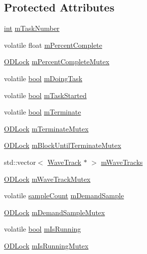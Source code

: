 \subsection*{Protected Attributes}
\begin{DoxyCompactItemize}
\item 
\hyperlink{xmltok_8h_a5a0d4a5641ce434f1d23533f2b2e6653}{int} \hyperlink{class_o_d_task_aac8bea3092cb5afa53b6f529b54afb26}{m\+Task\+Number}
\item 
volatile float \hyperlink{class_o_d_task_a81842f8c6d99d72ce3cd215c113a261d}{m\+Percent\+Complete}
\item 
\hyperlink{class_o_d_lock}{O\+D\+Lock} \hyperlink{class_o_d_task_add5ff78b44107292569dfdeeb90c8118}{m\+Percent\+Complete\+Mutex}
\item 
volatile \hyperlink{mac_2config_2i386_2lib-src_2libsoxr_2soxr-config_8h_abb452686968e48b67397da5f97445f5b}{bool} \hyperlink{class_o_d_task_ad90a5f35f8ec6c50357c9328781ee542}{m\+Doing\+Task}
\item 
volatile \hyperlink{mac_2config_2i386_2lib-src_2libsoxr_2soxr-config_8h_abb452686968e48b67397da5f97445f5b}{bool} \hyperlink{class_o_d_task_a0f4099666c884667eebb9433bcc3d6c7}{m\+Task\+Started}
\item 
volatile \hyperlink{mac_2config_2i386_2lib-src_2libsoxr_2soxr-config_8h_abb452686968e48b67397da5f97445f5b}{bool} \hyperlink{class_o_d_task_a38dd3cdea39254e59c505f5bfc9127e5}{m\+Terminate}
\item 
\hyperlink{class_o_d_lock}{O\+D\+Lock} \hyperlink{class_o_d_task_aa534f7033d7c3fc06a55f24aac50482a}{m\+Terminate\+Mutex}
\item 
\hyperlink{class_o_d_lock}{O\+D\+Lock} \hyperlink{class_o_d_task_a645d01cc507dfa49c3f7032753812bb2}{m\+Block\+Until\+Terminate\+Mutex}
\item 
std\+::vector$<$ \hyperlink{class_wave_track}{Wave\+Track} $\ast$ $>$ \hyperlink{class_o_d_task_aba0bd65cc43443f5eb27bc5278334bf2}{m\+Wave\+Tracks}
\item 
\hyperlink{class_o_d_lock}{O\+D\+Lock} \hyperlink{class_o_d_task_ae51c8c57331a0caea29ac0e26a295685}{m\+Wave\+Track\+Mutex}
\item 
volatile \hyperlink{include_2audacity_2_types_8h_afa427e1f521ea5ec12d054e8bd4d0f71}{sample\+Count} \hyperlink{class_o_d_task_a2805d376b4e66174128836a31ce4b4ce}{m\+Demand\+Sample}
\item 
\hyperlink{class_o_d_lock}{O\+D\+Lock} \hyperlink{class_o_d_task_a24ad4b2b8c1b2d647200b86bc9aabf50}{m\+Demand\+Sample\+Mutex}
\item 
volatile \hyperlink{mac_2config_2i386_2lib-src_2libsoxr_2soxr-config_8h_abb452686968e48b67397da5f97445f5b}{bool} \hyperlink{class_o_d_task_a01b2cdf425a94cc4c1cb450a40e19f34}{m\+Is\+Running}
\item 
\hyperlink{class_o_d_lock}{O\+D\+Lock} \hyperlink{class_o_d_task_a56765162fb9180721fddf08e8993e9ec}{m\+Is\+Running\+Mutex}
\end{DoxyCompactItemize}


